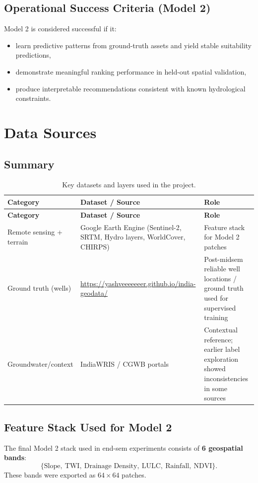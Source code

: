 \documentclass[12pt,a4paper]{report}
\begin{document}
\section{Operational Success Criteria (Model 2)}
Model 2 is considered successful if it:
\begin{itemize}
  \item learn predictive patterns from ground-truth assets and yield stable suitability predictions,
  \item demonstrate meaningful ranking performance in held-out spatial validation,
  \item produce interpretable recommendations consistent with known hydrological constraints.
\end{itemize}


\chapter{Data Sources}

\section{Summary}
\begin{longtable}{p{} p{} p{}}
\caption{Key datasets and layers used in the project.}\label{tab:datasets_final}\\
\toprule
\textbf{Category} & \textbf{Dataset / Source} & \textbf{Role} \\
\midrule
\endfirsthead
\toprule
\textbf{Category} & \textbf{Dataset / Source} & \textbf{Role} \\
\midrule
\endhead
Remote sensing + terrain & Google Earth Engine (Sentinel-2, SRTM, Hydro layers, WorldCover, CHIRPS) & Feature stack for Model 2 patches \\
Ground truth (wells) & \url{https://yashveeeeeeer.github.io/india-geodata/} & Post-midsem reliable well locations / ground truth used for supervised training \\
Groundwater/context & IndiaWRIS / CGWB portals & Contextual reference; earlier label exploration showed inconsistencies in some sources \\
\bottomrule
\end{longtable}

\section{Feature Stack Used for Model 2}
The final Model 2 stack used in end-sem experiments consists of \textbf{6 geospatial bands}:
\[
\{\text{Slope},\ \text{TWI},\ \text{Drainage Density},\ \text{LULC},\ \text{Rainfall},\ \text{NDVI}\}.
\]
These bands were exported as \(64\times64\) patches.
\end{document}
